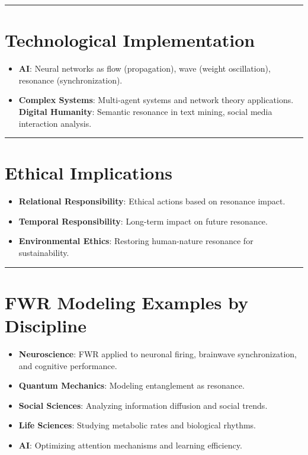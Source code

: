 \documentclass{article}
\begin{document}
\hrule

\section{Technological Implementation}
\begin{itemize}
    \item \textbf{AI}: Neural networks as flow (propagation), wave (weight oscillation), resonance (synchronization).
    \item \textbf{Complex Systems}: Multi-agent systems and network theory applications.
    \textbf{Digital Humanity}: Semantic resonance in text mining, social media interaction analysis.
\end{itemize}

\hrule

\section{Ethical Implications}
\begin{itemize}
    \item \textbf{Relational Responsibility}: Ethical actions based on resonance impact.
    \item \textbf{Temporal Responsibility}: Long-term impact on future resonance.
    \item \textbf{Environmental Ethics}: Restoring human-nature resonance for sustainability.
\end{itemize}

\hrule

\section{FWR Modeling Examples by Discipline}
\begin{itemize}
    \item \textbf{Neuroscience}: FWR applied to neuronal firing, brainwave synchronization, and cognitive performance.
    \item \textbf{Quantum Mechanics}: Modeling entanglement as resonance.
    \item \textbf{Social Sciences}: Analyzing information diffusion and social trends.
    \item \textbf{Life Sciences}: Studying metabolic rates and biological rhythms.
    \item \textbf{AI}: Optimizing attention mechanisms and learning efficiency.
\end{itemize}
\end{document}
